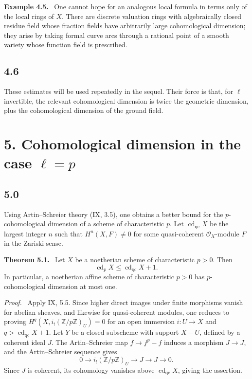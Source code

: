 \documentclass[11pt]{article}
\newcommand{\Oo}{\mathcal{O}}
\newcommand{\Zz}{\mathbb{Z}}
\newenvironment{statement}[1]{\par\medskip\noindent\textbf{#1.}\ }{\par\medskip}
\newenvironment{remarktext}[1]{\par\medskip\noindent\textbf{#1.}\ }{\par\medskip}
\newenvironment{prooftext}{\par\noindent\emph{Proof.}\ }{\par\medskip}
\begin{document}
\begin{remarktext}{Example 4.5}
One cannot hope for an analogous local formula in terms only of the local rings of \(X\). There are discrete valuation rings with algebraically closed residue field whose fraction fields have arbitrarily large cohomological dimension; they arise by taking formal curve arcs through a rational point of a smooth variety whose function field is prescribed.
\end{remarktext}

\subsection*{4.6}
These estimates will be used repeatedly in the sequel. Their force is that, for \(\ell\) invertible, the relevant cohomological dimension is twice the geometric dimension, plus the cohomological dimension of the ground field.

\section*{5. Cohomological dimension in the case \(\ell=p\)}

\subsection*{5.0}
Using Artin--Schreier theory (IX, 3.5), one obtains a better bound for the \(p\)-cohomological dimension of a scheme of characteristic \(p\). Let \(\operatorname{cd}_{\mathrm{qc}}X\) be the largest integer \(n\) such that \(H^n(X,F)\ne0\) for some quasi-coherent \(\Oo_X\)-module \(F\) in the Zariski sense.

\begin{statement}{Theorem 5.1}
Let \(X\) be a noetherian scheme of characteristic \(p>0\). Then
\[
\operatorname{cd}_pX\leq \operatorname{cd}_{\mathrm{qc}}X+1.
\]
In particular, a noetherian affine scheme of characteristic \(p>0\) has \(p\)-cohomological dimension at most one.
\end{statement}

\begin{prooftext}
Apply IX, 5.5. Since higher direct images under finite morphisms vanish for abelian sheaves, and likewise for quasi-coherent modules, one reduces to proving \(H^q(X,i_!(\Zz/p\Zz)_U)=0\) for an open immersion \(i:U\to X\) and \(q>\operatorname{cd}_{\mathrm{qc}}X+1\). Let \(Y\) be a closed subscheme with support \(X-U\), defined by a coherent ideal \(J\). The Artin--Schreier map \(f\mapsto f^p-f\) induces a morphism \(J\to J\), and the Artin--Schreier sequence gives
\[
0\longrightarrow i_!(\Zz/p\Zz)_U\longrightarrow J\longrightarrow J\longrightarrow0.
\]
Since \(J\) is coherent, its cohomology vanishes above \(\operatorname{cd}_{\mathrm{qc}}X\), giving the assertion.
\end{prooftext}
\end{document}
